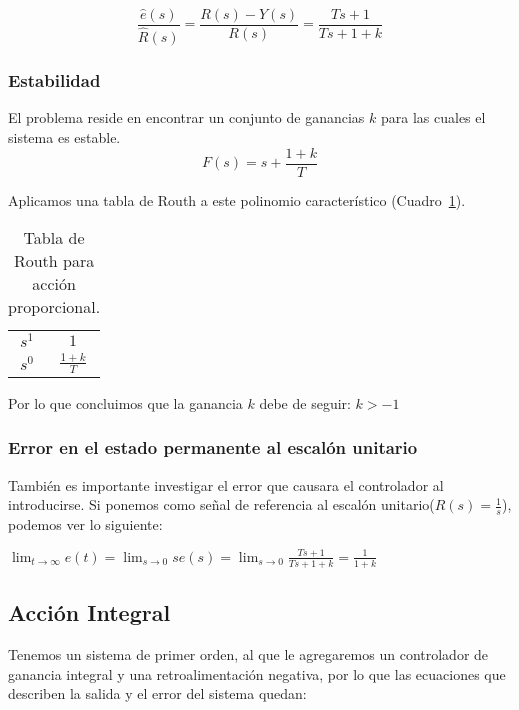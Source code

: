     \begin{equation}
        \frac{\hat{e}(s)}{\hat{R}(s)} = \frac{R(s) - Y(s)}{R(s)} = \frac{Ts + 1}{Ts + 1 + k}
    \end{equation}

        \subsubsection{Estabilidad}
            El problema reside en encontrar un conjunto de ganancias $k$ para las cuales el sistema es estable.
            \begin{equation}
                F(s) = s + \frac{1 + k}{T}
            \end{equation}

            Aplicamos una tabla de Routh a este polinomio característico (Cuadro~\ref{tab:AccionProporcional}).

            \begin{table}[htbp]
                \centering
                \begin{tabular}{c|c}
                $s^1$ & $1$ \\
                $s^0$ & $\frac{1+k}{T}$
                \end{tabular}
                \caption{\label{tab:AccionProporcional}Tabla de Routh para acción proporcional.}
            \end{table}

Por lo que concluimos que la ganancia $k$ debe de seguir: $k>-1$

        \subsubsection{Error en el estado permanente al escalón unitario}
            También es importante investigar el error que causara el controlador al introducirse. Si ponemos como señal de referencia al escalón unitario($R(s) = \frac{1}{s}$), podemos ver lo siguiente:

            \begin{math}
                \displaystyle \lim_{t \to \infty} e(t) = \lim_{s \to 0} s e(s) = \lim_{s \to 0} \frac{Ts + 1}{Ts + 1 + k} = \frac{1}{1 + k}
            \end{math}

    \subsection{Acción Integral}
        Tenemos un sistema de primer orden, al que le agregaremos un controlador de ganancia integral y una retroalimentación negativa, por lo que las ecuaciones que describen la salida y el error del sistema quedan:

